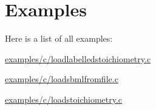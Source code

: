 \section{Examples}
Here is a list of all examples\+:\begin{DoxyCompactItemize}
\item 
\hyperlink{examples_2c_2loadlabelledstoichiometry_8c-example}{examples/c/loadlabelledstoichiometry.\+c}
\item 
\hyperlink{examples_2c_2loadsbmlfromfile_8c-example}{examples/c/loadsbmlfromfile.\+c}
\item 
\hyperlink{examples_2c_2loadstoichiometry_8c-example}{examples/c/loadstoichiometry.\+c}
\end{DoxyCompactItemize}
